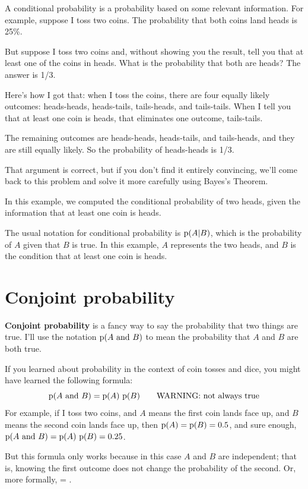 \documentclass[12pt]{book}
\theoremstyle{exercise}
\begin{document}
A conditional probability is a probability based on some relevant information.  For example, suppose I toss two coins.
The probability that both coins land heads is 25\%.

But suppose I toss two coins and, without showing you the result, tell you that at least one of the coins in heads.
What is the probability that both are heads?
The answer is 1/3.

Here's how I got that: when I toss the coins, there are four equally likely outcomes: heads-heads, heads-tails, tails-heads, and tails-tails.
When I tell you that at least one coin is heads, that eliminates one outcome, tails-tails.

The remaining outcomes are heads-heads, heads-tails, and tails-heads, and they are still equally likely.
So the probability of heads-heads is 1/3.

That argument is correct, but if you don't find it entirely convincing, we'll come back to this problem and solve it more carefully using Bayes's Theorem.

In this example, we computed the conditional probability of two heads, given the information that at least one coin is heads.

The usual notation for conditional probability is $\mathrm{p}(A|B)$, which
is the probability of $A$ given that $B$ is true.  In this
example, $A$ represents the two heads, and $B$ is the condition that at least one coin is heads.


\section{Conjoint probability}

{\bf Conjoint probability} is a fancy way to say the probability that
two things are true.  I'll use the notation $\mathrm{p}(A ~\mathrm{and}~ B)$ to mean the
probability that $A$ and $B$ are both true.


If you learned about probability in the context of coin tosses and
dice, you might have learned the following formula:
%
\[ \mathrm{p}(A ~\mathrm{and}~ B) = \mathrm{p}(A)~\mathrm{p}(B) \quad\quad\mbox{WARNING: not always true}\]
%
For example, if I toss two coins, and $A$ means the first coin lands
face up, and $B$ means the second coin lands face up, then $\mathrm{p}(A) =
\mathrm{p}(B) = 0.5$, and sure enough, $\mathrm{p}(A ~\mathrm{and}~ B) = \mathrm{p}(A)~\mathrm{p}(B) = 0.25$.

But this formula only works because in this case $A$ and $B$ are
independent; that is, knowing the first outcome does
not change the probability of the second.  Or, more formally,
 = .
\end{document}
